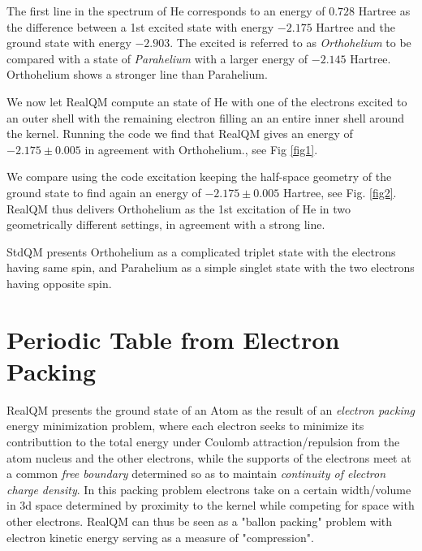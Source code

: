\documentclass[11pt]{article} %
\begin{document}
The first line in the spectrum of He corresponds to an energy of $0.728$ Hartree as the difference between a 1st excited state with energy $-2.175$ Hartree and the ground state with energy $-2.903$. The excited is referred to as \emph{Orthohelium} to be compared with a state of \emph{Parahelium} with a larger energy of $-2.145$ Hartree.  Orthohelium shows a stronger line than Parahelium.

We now let RealQM compute an state of He with one of the electrons excited to an outer shell with the remaining electron filling an an entire inner shell around the kernel.  Running the code \cite{code1} we find that RealQM gives an energy of $-2.175\pm 0.005$ in agreement with Orthohelium., see Fig \ref{fig1}. 

We compare using the code \cite{code2} excitation keeping the half-space geometry of the ground state to find again an energy of $-2.175\pm 0.005$ Hartree,  see Fig. \ref{fig2}. RealQM thus delivers Orthohelium as the 1st excitation of He in two geometrically different settings,  in agreement with a strong line.

StdQM presents Orthohelium as a complicated triplet state with the electrons having same spin,  and Parahelium as a simple singlet state with the two electrons having opposite spin.







\section{Periodic Table from Electron Packing}

RealQM presents the ground state of an Atom as the result of an \emph{electron packing} energy minimization problem,  where each electron seeks to minimize its contributtion to the total energy under Coulomb attraction/repulsion from the atom nucleus and the other electrons,  while the supports of the electrons meet at a common \emph{free boundary} determined so as to maintain \emph{continuity of electron charge density}.  In this packing problem electrons take on a certain width/volume in 3d space determined by proximity to the kernel while competing for space with other electrons.  RealQM can thus be seen as a "ballon packing" problem with electron kinetic energy serving as a measure of "compression".    


\end{document}
